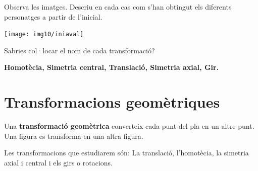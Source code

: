  

\begin{iniaval}
	
	Observa les imatges. Descriu en cada cas com s'han obtingut els diferents personatges a partir de l'inicial.
	
	\begin{center}
		\texttt{[image: img10/iniaval]}
	\end{center}

	Sabries col·locar el nom de cada transformació? 
	
	\begin{center}
		 \textbf{ Homotècia, Simetria central, Translació, Simetria axial, Gir. }
	\end{center}
\end{iniaval}

\section{Transformacions geomètriques}


\begin{theorybox}
	Una \textbf{transformació geomètrica} converteix cada punt del pla en un altre punt. Una figura es transforma en una altra figura.
	
	Les transformacions que estudiarem són: La translació, l'homotècia, la simetria axial i central i els girs o rotacions.
\end{theorybox}

